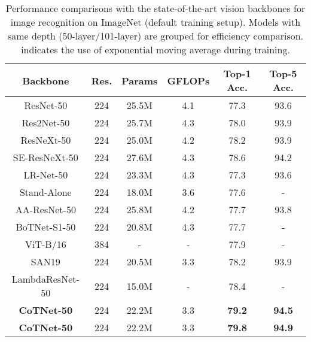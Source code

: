 \documentclass[10pt,twocolumn,letterpaper]{article}
\begin{document}
\begin{table}[!tb]\small
  \centering
  \caption{Performance comparisons with the state-of-the-art vision backbones for image recognition on ImageNet (default training setup). Models with same depth (50-layer/101-layer) are grouped for efficiency comparison.  indicates the use of exponential moving average during training.}
  \setlength{\tabcolsep}{0.5pt}
\begin{tabular}{c|c|cc|cc}
\Xhline{2\arrayrulewidth}
Backbone                                                & Res. & Params & GFLOPs & Top-1 Acc. & Top-5 Acc. \\ \hline
ResNet-50 \cite{he2016deep}                             & 224  & 25.5M  & 4.1    & 77.3       & 93.6       \\
Res2Net-50 \cite{gao2019res2net}                        & 224  & 25.7M  & 4.3    & 78.0       & 93.9       \\
ResNeXt-50 \cite{xie2017aggregated}                     & 224  & 25.0M  & 4.2    & 78.2       & 93.9       \\
SE-ResNeXt-50 \cite{hu2018squeeze}                      & 224  & 27.6M  & 4.3    & 78.6       & 94.2       \\
LR-Net-50 \cite{hu2019local}                            & 224  & 23.3M  & 4.3    & 77.3       & 93.6          \\
Stand-Alone \cite{ramachandran2019stand}        & 224  & 18.0M  & 3.6    & 77.6       & -          \\
AA-ResNet-50 \cite{bello2019attention}                  & 224  & 25.8M  & 4.2    & 77.7       & 93.8       \\
BoTNet-S1-50 \cite{srinivas2021bottleneck}              & 224  & 20.8M  & 4.3    & 77.7       & -          \\
ViT-B/16 \cite{dosovitskiy2020image}                    & 384  & -      & -      & 77.9       & -            \\
SAN19  \cite{zhao2020exploring}                         & 224  & 20.5M  & 3.3    & 78.2       & 93.9       \\
LambdaResNet-50\cite{bello2021lambdanetworks}   & 224  & 15.0M  & -      & 78.4       & -          \\ \hline
\textbf{CoTNet-50}                                      & 224  & 22.2M  & 3.3    & \textbf{79.2}  & \textbf{94.5}  \\
\textbf{CoTNet-50}                              & 224  & 22.2M  & 3.3    & \textbf{79.8}  & \textbf{94.9}  \\

\end{tabular}
\end{table}
\end{document}

